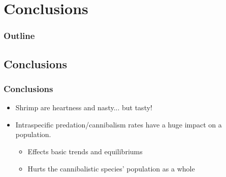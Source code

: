 \section{Conclusions}


\begin{frame}
  \frametitle{Outline}
  \tableofcontents[ currentsection ]
\end{frame}

\subsection{Conclusions}

\begin{frame}
  \frametitle{Conclusions}
\vfill
\begin{itemize}
	\item Shrimp are heartness and nasty... but tasty!
			\vfill
	\item Intraspecific predation/cannibalism rates have a huge impact on a population.
			\vfill
	\begin{itemize}
		\item Effects basic trends and equilibriums
			\vfill
		\item Hurts the cannibalistic species' population as a whole
	\end{itemize}
			\vfill
\end{itemize}
  
\end{frame}